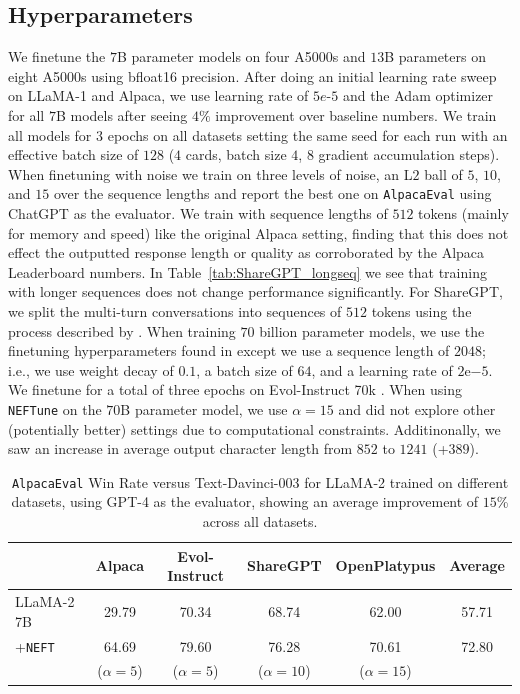\documentclass{article} %
\newcommand{\neft}{\texttt{NEFT}}
\newcommand{\neftune}{\texttt{NEFTune}}
\newcommand{\llama}{LLaMA}
\begin{document}
\subsection{Hyperparameters} \label{sec:hyperparameters}
We finetune the $7$B parameter models on four A5000s and $13$B parameters on eight A5000s using bfloat16 precision. After doing an initial learning rate sweep on \llama{}-1 and Alpaca, we use learning rate of $5e$-$5$ and the Adam optimizer for all $7$B models after seeing $4\%$ improvement over baseline numbers. We train all models for $3$ epochs on all datasets setting the same seed for each run with an effective batch size of $128$ ($4$ cards, batch size $4$, $8$ gradient accumulation steps). When finetuning with noise we train on three levels of noise, an L$2$ ball of $5$, $10$, and $15$ over the sequence lengths and report the best one on \texttt{AlpacaEval} using ChatGPT as the evaluator. 
We train with sequence lengths of $512$ tokens (mainly for memory and speed) like the original Alpaca setting, finding that this does not effect the outputted response length or quality as corroborated by the Alpaca Leaderboard numbers. In Table~\ref{tab:ShareGPT_longseq} we see that training with longer sequences does not change performance significantly. For ShareGPT, we split the multi-turn conversations into sequences of $512$ tokens using the process described by \citet{vicuna2023}. 
When training $70$ billion parameter models, we use the finetuning hyperparameters found in \citet{touvron2023llama2} except we use a sequence length of $2048$; i.e., we use weight decay of $0.1$, a batch size of $64$, and a learning rate of $2\mathrm{e}{-5}$. We finetune for a total of three epochs on Evol-Instruct 70k \citep{xu2023wizardlm}. When using \neftune{} on the $70$B parameter model, we use $\alpha=15$ and did not explore other (potentially better) settings due to computational constraints. Additinonally, we saw an increase in average output character length from $852$ to $1241$ (+$389$).

\begin{table}[t]
\centering
\caption{\texttt{AlpacaEval} Win Rate versus Text-Davinci-003 for \llama{}-2 trained on different datasets, using GPT-4 as the evaluator, showing an average improvement of $15$\% across all datasets.}\label{tab:LLaMA-2_GPT-4_with_alpha}
\begin{tabular}{lccccc}
\toprule
            & Alpaca & Evol-Instruct & ShareGPT & OpenPlatypus & Average \\ \midrule
\llama{}-2 7B  & 29.79  & 70.34    & 68.74              & 62.00        & 57.71   \\ 
+\neft{}  & 64.69  & 79.60    & 76.28              & 70.61        & 72.80  \\
          & ($\alpha=5$) & ($\alpha=5$) & ($\alpha=10$) & ($\alpha=15$) & \\
\bottomrule
\end{tabular}
\end{table}
\end{document}
